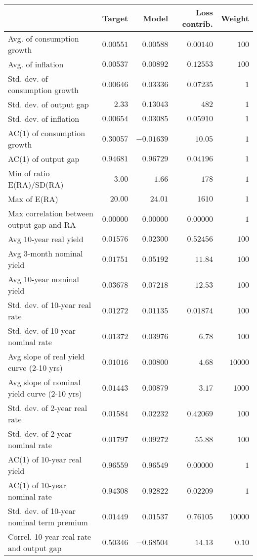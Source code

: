 \begin{tabular}{lrrrr} \hline  & Target & Model & Loss contrib. & Weight \\ \hline Avg. of consumption growth & $0.00551$ & $0.00588$ & $0.00140$ & $100$ \\ Avg. of inflation & $0.00537$ & $0.00892$ & $0.12553$ & $100$ \\ Std. dev. of consumption growth & $0.00646$ & $0.03336$ & $0.07235$ & $1$ \\ Std. dev. of output gap & $2.33$ & $0.13043$ & $482$ & $1$ \\ Std. dev. of inflation & $0.00654$ & $0.03085$ & $0.05910$ & $1$ \\ AC(1) of consumption growth & $0.30057$ & $-0.01639$ & $10.05$ & $1$ \\ AC(1) of output gap & $0.94681$ & $0.96729$ & $0.04196$ & $1$ \\ Min of ratio E(RA)/SD(RA) & $3.00$ & $1.66$ & $178$ & $1$ \\ Max of E(RA) & $20.00$ & $24.01$ & $1610$ & $1$ \\ Max correlation between output gap and RA & $0.00000$ & $0.00000$ & $0.00000$ & $1$ \\ Avg 10-year real yield & $0.01576$ & $0.02300$ & $0.52456$ & $100$ \\ Avg 3-month nominal yield & $0.01751$ & $0.05192$ & $11.84$ & $100$ \\ Avg 10-year nominal yield & $0.03678$ & $0.07218$ & $12.53$ & $100$ \\ Std. dev. of 10-year real rate & $0.01272$ & $0.01135$ & $0.01874$ & $100$ \\ Std. dev. of 10-year nominal rate & $0.01372$ & $0.03976$ & $6.78$ & $100$ \\ Avg slope of real yield curve (2-10 yrs) & $0.01016$ & $0.00800$ & $4.68$ & $10000$ \\ Avg slope of nominal yield curve (2-10 yrs) & $0.01443$ & $0.00879$ & $3.17$ & $1000$ \\ Std. dev. of 2-year real rate & $0.01584$ & $0.02232$ & $0.42069$ & $100$ \\ Std. dev. of 2-year nominal rate & $0.01797$ & $0.09272$ & $55.88$ & $100$ \\ AC(1) of 10-year real yield & $0.96559$ & $0.96549$ & $0.00000$ & $1$ \\ AC(1) of 10-year nominal rate & $0.94308$ & $0.92822$ & $0.02209$ & $1$ \\ Std. dev. of 10-year nominal term premium & $0.01449$ & $0.01537$ & $0.76105$ & $10000$ \\ Correl. 10-year real rate and output gap & $0.50346$ & $-0.68504$ & $14.13$ & $0.10$ \\ \hline \end{tabular}